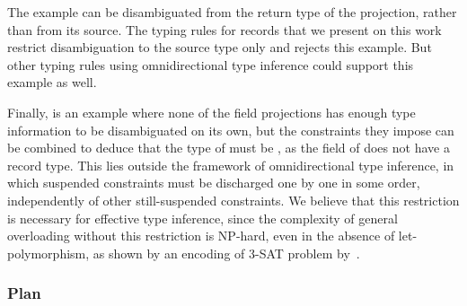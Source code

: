 \documentclass[acmsmall,screen,nonacm,review]{acmart}
\begin{document}
The example  can be disambiguated from the return type of the
projection, rather than from its source. The typing rules for records that
we present on this work restrict disambiguation to the source type only and
rejects this example. But
other typing rules using omnidirectional type inference could support this
example as well.

Finally,  is an example where none of the field
projections has enough type information to be disambiguated on its own, but the
constraints they impose can be combined to deduce that the type of
 must be , as the  field of 
does not have a record type. This lies outside the framework of
omnidirectional type inference, in which suspended constraints must be
discharged one by one in some order, independently of other
still-suspended constraints.
%
We believe that this restriction is necessary for effective type inference,
since the complexity of general overloading without this restriction is
NP-hard, even in the absence of let-polymorphism, as shown by an encoding of
3-SAT problem by~\citet*
{Chargueraud-Bodin-Dunfield-Riboulet/jfla2025}.

\subsubsection* {Plan}
\end{document}
